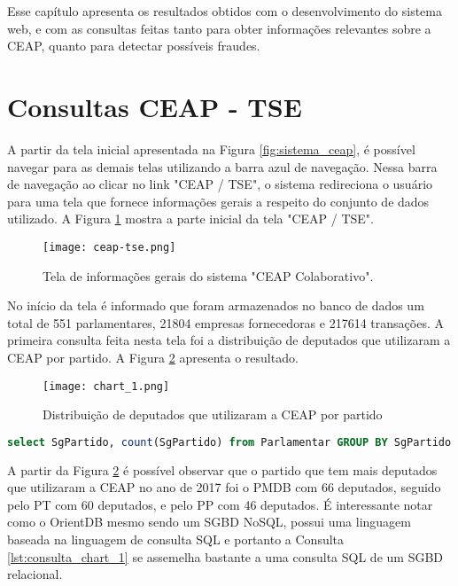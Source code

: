 Esse capítulo apresenta os resultados obtidos com o desenvolvimento do sistema web, e com as consultas feitas tanto para obter informações relevantes sobre a CEAP, quanto para detectar possíveis fraudes.

\section{Consultas CEAP - TSE} \label{consulta_ceap_tse}

A partir da tela inicial apresentada na Figura \ref{fig:sistema_ceap}, é possível navegar para as demais telas utilizando a barra azul de navegação. Nessa barra de navegação ao clicar no link "CEAP / TSE", o sistema redireciona o usuário para uma tela que fornece informações gerais a respeito do conjunto de dados utilizado. A Figura \ref{fig:sistema_ceap_tse} mostra a parte inicial da tela "CEAP / TSE".

\begin{figure}[H]
\centering
\texttt{[image: ceap-tse.png]}
\caption{Tela de informações gerais do sistema "CEAP Colaborativo".}
\label{fig:sistema_ceap_tse}
\end{figure}

No início da tela é informado que foram armazenados no banco de dados um total de 551 parlamentares, 21804 empresas fornecedoras e 217614 transações.
A primeira consulta feita nesta tela foi a distribuição de deputados que utilizaram a CEAP por partido. A Figura \ref{fig:chart_1} apresenta o resultado.

\begin{figure}[H]
\centering
\texttt{[image: chart\_1.png]}
\caption{Distribuição de deputados que utilizaram a CEAP por partido}
\label{fig:chart_1}
\end{figure}

\begin{lstlisting}[label={lst:consulta_chart_1}, caption={Consulta para a Figura \ref{fig:chart_1}},captionpos=b, language=sql]
select SgPartido, count(SgPartido) from Parlamentar GROUP BY SgPartido
\end{lstlisting}

A partir da Figura \ref{fig:chart_1} é possível observar que o partido que tem mais deputados que utilizaram a CEAP no ano de 2017 foi o PMDB com 66 deputados, seguido pelo PT com 60 deputados, e pelo PP com 46 deputados. É interessante notar como o OrientDB mesmo sendo um SGBD NoSQL, possui uma linguagem baseada na linguagem de consulta SQL e portanto a Consulta \ref{lst:consulta_chart_1} se assemelha bastante a uma consulta SQL de um SGBD relacional.

